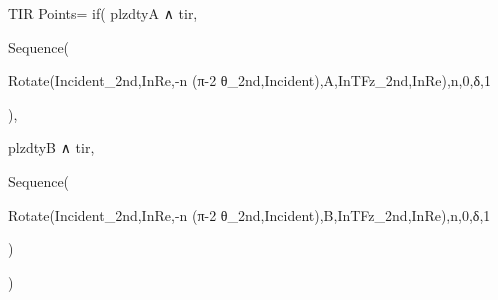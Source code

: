 TIR Points=
  if(
    plzdtyA ∧ tir,

    Sequence(

    Rotate(Incident_{2nd,InRe},-n (π-2 θ_{2nd,Incident}),A,InTFz_{2nd,InRe}),n,0,δ,1

    ),

    plzdtyB ∧ tir,

    Sequence(

    Rotate(Incident_{2nd,InRe},-n (π-2 θ_{2nd,Incident}),B,InTFz_{2nd,InRe}),n,0,δ,1

    )

  )

  